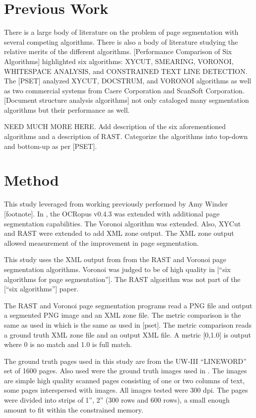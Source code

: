 \documentclass[conference]{IEEEtran}
\begin{document}
\section{Previous Work}

There is a large body of literature on the problem of page segmentation with
several competing algorithms. There is also a body of literature studying the
relative merits of the different algorithms. [Performance Comparison of Six
Algorithms] highlighted six algorithms: XYCUT, SMEARING, VORONOI, WHITESPACE
ANALYSIS, and CONSTRAINED TEXT LINE DETECTION. The [PSET] analyzed XYCUT,
DOCSTRUM, and VORONOI algorithms as well as two commercial systems from
Caere Corporation and ScanSoft Corporation. [Document structure analysis
algorithms] not only cataloged many segmentation algorithms but their
performance as well.

\begin{bold}
NEED MUCH MORE HERE. Add description of the six aforementioned algorithms and a
description of RAST. Categorize the algorithms into top-down and bottom-up as
per [PSET].
\end{bold}

%
%
\section{Method}
This study leveraged from working previously performed by Amy Winder
[footnote]. In \cite{IEEEhowto:Winder}, the OCRopus v0.4.3 was extended with additional page
segmentation capabilities. The Voronoi algorithm was extended. Also, XYCut and
RAST were extended to add XML zone output. The XML zone output allowed 
measurement of the improvement in page segmentation.

This study uses the XML output from \cite{IEEEhowto:Winder} from the RAST and Voronoi page
segmentation algorithms. Voronoi was judged to be of high quality in [“six
algorithms for page segmentation”]. The RAST algorithm was not part of the
[“six algorithms”] paper. 

The RAST and Voronoi page segmentation programs read a PNG file and output a
segmented PNG image and an XML zone file. The metric comparison is the same as
used in \cite{IEEEhowto:Winder} which is the same as used in [pset]. The metric comparison
reads a ground truth XML zone file and an output XML file. A metric [0,1.0] is
output where 0 is no match and 1.0 is full match. 

The ground truth pages used in this study are from the UW-III “LINEWORD” set of
1600 pages. Also used were the ground truth images used in \cite{IEEEhowto:Winder}. The
\cite{IEEEhowto:Winder} images are simple high quality scanned pages consisting of one or two
columns of text, some pages interspersed with images. All images tested were
300 dpi.  The pages were divided into strips of 1”, 2” (300 rows and 600 rows),
a small enough amount to fit within the constrained memory. 
\end{document}
